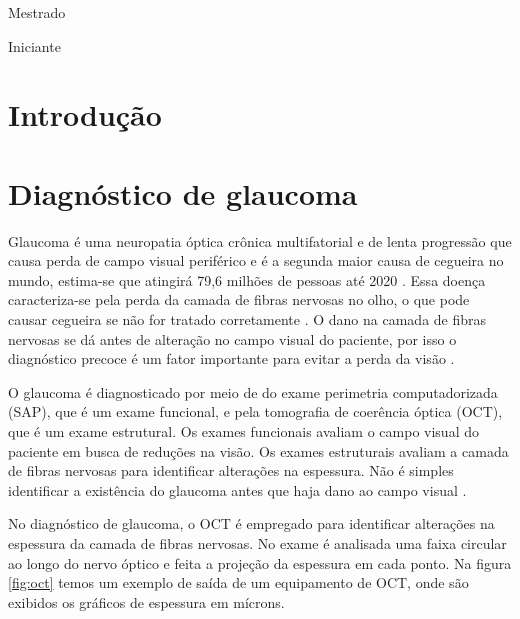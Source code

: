 \documentclass[conference]{IEEEtran}
\begin{document}
\renewcommand\IEEEkeywordsname{Classifica\c{c}\~{a}o}
\begin{IEEEkeywords}
	\label{classificacao}
	Mestrado
\end{IEEEkeywords}

\renewcommand\IEEEkeywordsname{Categoria}
\begin{IEEEkeywords}
	\label{Categoria}
	Iniciante 
\end{IEEEkeywords}

\IEEEpeerreviewmaketitle


\section{Introdução}


\section{Diagnóstico de glaucoma}


Glaucoma é uma neuropatia óptica crônica multifatorial e de lenta progressão que causa perda de campo visual periférico e é a segunda maior causa de cegueira no mundo, estima-se que atingirá 79,6 milhões de pessoas até 2020 \cite{Quigley2006}. Essa doença caracteriza-se pela perda da camada de fibras nervosas no olho, o que pode causar cegueira se não for tratado corretamente \cite{Quigley2011}. O dano na camada de fibras nervosas se dá antes de alteração no campo visual do paciente, por isso o diagnóstico precoce é um fator importante para evitar a perda da visão \cite{Malik2012}.

O glaucoma é diagnosticado por meio de do exame perimetria computadorizada (SAP), que é um exame funcional, e pela tomografia de coerência óptica (OCT), que é um exame estrutural. Os exames funcionais avaliam o campo visual do paciente em busca de reduções na visão. Os exames estruturais avaliam a camada de fibras nervosas para identificar alterações na espessura. Não é simples identificar a existência do glaucoma antes que haja dano ao campo visual \cite{Populacoes2009}.

No diagnóstico de glaucoma, o OCT é empregado para identificar alterações na espessura da camada de fibras nervosas. No exame é analisada uma faixa circular ao longo do nervo óptico e feita a projeção da espessura em cada ponto. Na figura \ref{fig:oct} temos um exemplo de saída de um equipamento de OCT, onde são exibidos os gráficos de espessura em mícrons. 
\end{document}

